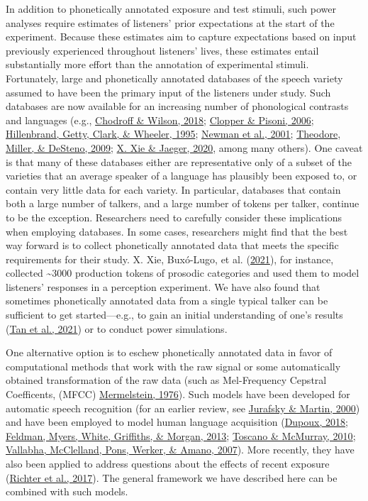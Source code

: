 \documentclass[
  11pt,
  man,floatsintext]{apa6}
\begin{document}
In addition to phonetically annotated exposure and test stimuli, such power analyses require estimates of listeners' prior expectations at the start of the experiment. Because these estimates aim to capture expectations based on input previously experienced throughout listeners' lives, these estimates entail substantially more effort than the annotation of experimental stimuli. Fortunately, large and phonetically annotated databases of the speech variety assumed to have been the primary input of the listeners under study. Such databases are now available for an increasing number of phonological contrasts and languages (e.g., \protect\hyperlink{ref-chodroff-wilson2018}{Chodroff \& Wilson, 2018}; \protect\hyperlink{ref-clopper-pisoni2006}{Clopper \& Pisoni, 2006}; \protect\hyperlink{ref-hillenbrand1995}{Hillenbrand, Getty, Clark, \& Wheeler, 1995}; \protect\hyperlink{ref-newman2001}{Newman et al., 2001}; \protect\hyperlink{ref-theodore2009}{Theodore, Miller, \& DeSteno, 2009}; \protect\hyperlink{ref-xie-jaeger2020}{X. Xie \& Jaeger, 2020}, among many others). One caveat is that many of these databases either are representative only of a subset of the varieties that an average speaker of a language has plausibly been exposed to, or contain very little data for each variety. In particular, databases that contain both a large number of talkers, and a large number of tokens per talker, continue to be the exception. Researchers need to carefully consider these implications when employing databases. In some cases, researchers might find that the best way forward is to collect phonetically annotated data that meets the specific requirements for their study. X. Xie, Buxó-Lugo, et al. (\protect\hyperlink{ref-xie2021cognition}{2021}), for instance, collected \textasciitilde3000 production tokens of prosodic categories and used them to model listeners' responses in a perception experiment. We have also found that sometimes phonetically annotated data from a single typical talker can be sufficient to get started---e.g., to gain an initial understanding of one's results (\protect\hyperlink{ref-tan2021}{Tan et al., 2021}) or to conduct power simulations.

One alternative option is to eschew phonetically annotated data in favor of computational methods that work with the raw signal or some automatically obtained transformation of the raw data (such as Mel-Frequency Cepstral Coefficents, (MFCC) \protect\hyperlink{ref-Mermelstein1976}{Mermelstein, 1976}). Such models have been developed for automatic speech recognition (for an earlier review, see \protect\hyperlink{ref-jurafsky-martin2000}{Jurafsky \& Martin, 2000}) and have been employed to model human language acquisition (\protect\hyperlink{ref-dupoux2018}{Dupoux, 2018}; \protect\hyperlink{ref-feldman2013}{Feldman, Myers, White, Griffiths, \& Morgan, 2013}; \protect\hyperlink{ref-toscano-mcmurray2010}{Toscano \& McMurray, 2010}; \protect\hyperlink{ref-vallabha2007}{Vallabha, McClelland, Pons, Werker, \& Amano, 2007}). More recently, they have also been applied to address questions about the effects of recent exposure (\protect\hyperlink{ref-richter2017}{Richter et al., 2017}). The general framework we have described here can be combined with such models.
\end{document}
